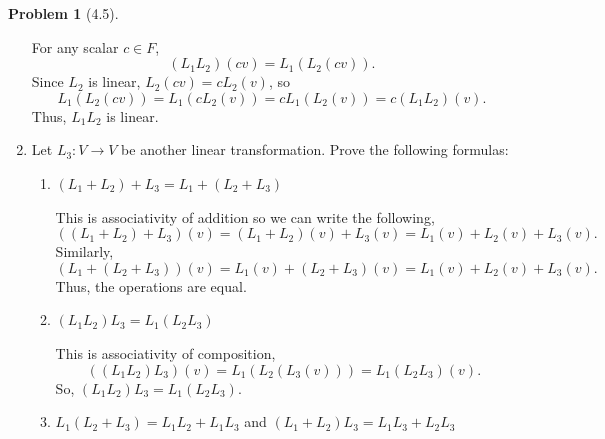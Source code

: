 \documentclass[12pt]{article}
\theoremstyle{definition}
\newtheorem{problem}{Problem}
\begin{document}
\begin{problem}[4.5]
\begin{enumerate}[label=(\alph*)]
\begin{solution}
            For any scalar $c \in F$,
            \[
            (L_1 L_2)(cv) = L_1(L_2(cv)).
            \]
            Since $L_2$ is linear, $L_2(cv) = c L_2(v)$, so
            \[
            L_1(L_2(cv)) = L_1(c L_2(v)) = c L_1(L_2(v)) = c (L_1 L_2)(v).
            \]
            Thus, $L_1 L_2$ is linear.
        \end{solution}

        \item Let $L_3: V \longrightarrow V$ be another linear transformation. Prove the following formulas:
              \begin{enumerate}[label=(\arabic*)]
                  \item $(L_1 + L_2) + L_3 = L_1 + (L_2 + L_3)$
                  
                        \begin{solution}
                            This is associativity of addition so we can write the following,
                            \[
                                ((L_1 + L_2) + L_3)(v) = (L_1 + L_2)(v) + L_3(v) = L_1(v) + L_2(v) + L_3(v).
                            \]
                            Similarly,
                            \[
                                (L_1 + (L_2 + L_3))(v) = L_1(v) + (L_2 + L_3)(v) = L_1(v) + L_2(v) + L_3(v).
                            \]
                            Thus, the operations are equal.
                        \end{solution}
                  \item $(L_1L_2)L_3 = L_1(L_2L_3)$
                  
                        \begin{solution}
                            This is associativity of composition,
                            \[
                                ((L_1 L_2) L_3)(v) = L_1(L_2(L_3(v))) = L_1 (L_2 L_3)(v).
                            \]
                            So, \((L_1 L_2) L_3 = L_1 (L_2 L_3)\).
                        \end{solution}
                  \item $L_1(L_2 + L_3) = L_1L_2 + L_1L_3$ and $(L_1 + L_2)L_3 = L_1L_3 + L_2L_3$
                  

\end{enumerate}
\end{enumerate}
\end{problem}
\end{document}
